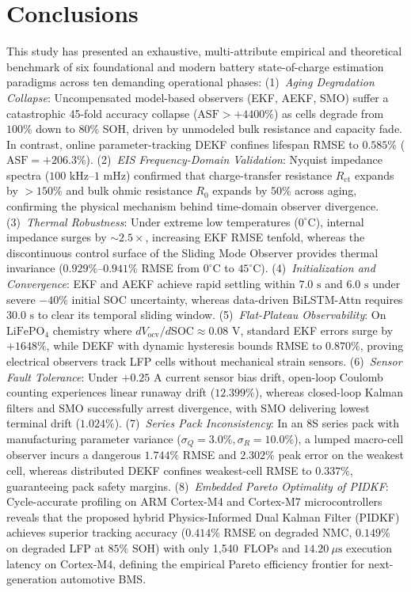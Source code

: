 \documentclass[balance,nocopyright,upint,varvw,hyphenate,barcolor=NavyBlue,nolists]{asmejour}
\begin{document}
\section{Conclusions}
This study has presented an exhaustive, multi-attribute empirical and theoretical benchmark of six foundational and modern battery state-of-charge estimation paradigms across ten demanding operational phases:
(1)~\emph{Aging Degradation Collapse}: Uncompensated model-based observers (EKF, AEKF, SMO) suffer a catastrophic 45-fold accuracy collapse ($\text{ASF} > +4400\%$) as cells degrade from $100\%$ down to $80\%$ SOH, driven by unmodeled bulk resistance and capacity fade. In contrast, online parameter-tracking DEKF confines lifespan RMSE to $0.585\%$ ($\text{ASF} = +206.3\%$).
(2)~\emph{EIS Frequency-Domain Validation}: Nyquist impedance spectra ($100\text{ kHz}$--$1\text{ mHz}$) confirmed that charge-transfer resistance $R_{\text{ct}}$ expands by $> 150\%$ and bulk ohmic resistance $R_0$ expands by $50\%$ across aging, confirming the physical mechanism behind time-domain observer divergence.
(3)~\emph{Thermal Robustness}: Under extreme low temperatures ($0^\circ\text{C}$), internal impedance surges by $\sim 2.5\times$, increasing EKF RMSE tenfold, whereas the discontinuous control surface of the Sliding Mode Observer provides thermal invariance ($0.929\%\text{--}0.941\%$ RMSE from $0^\circ\text{C}$ to $45^\circ\text{C}$).
(4)~\emph{Initialization and Convergence}: EKF and AEKF achieve rapid settling within $7.0\text{ s}$ and $6.0\text{ s}$ under severe $-40\%$ initial SOC uncertainty, whereas data-driven BiLSTM-Attn requires $30.0\text{ s}$ to clear its temporal sliding window.
(5)~\emph{Flat-Plateau Observability}: On $\text{LiFePO}_4$ chemistry where $d V_{\text{ocv}}/d\text{SOC} \approx 0.08\text{ V}$, standard EKF errors surge by $+1648\%$, while DEKF with dynamic hysteresis bounds RMSE to $0.870\%$, proving electrical observers track LFP cells without mechanical strain sensors.
(6)~\emph{Sensor Fault Tolerance}: Under $+0.25\text{ A}$ current sensor bias drift, open-loop Coulomb counting experiences linear runaway drift ($12.399\%$), whereas closed-loop Kalman filters and SMO successfully arrest divergence, with SMO delivering lowest terminal drift ($1.024\%$).
(7)~\emph{Series Pack Inconsistency}: In an 8S series pack with manufacturing parameter variance ($\sigma_Q = 3.0\%, \sigma_R = 10.0\%$), a lumped macro-cell observer incurs a dangerous $1.744\%$ RMSE and $2.302\%$ peak error on the weakest cell, whereas distributed DEKF confines weakest-cell RMSE to $0.337\%$, guaranteeing pack safety margins.
(8)~\emph{Embedded Pareto Optimality of PIDKF}: Cycle-accurate profiling on ARM Cortex-M4 and Cortex-M7 microcontrollers reveals that the proposed hybrid Physics-Informed Dual Kalman Filter (PIDKF) achieves superior tracking accuracy ($0.414\%$ RMSE on degraded NMC, $0.149\%$ on degraded LFP at $85\%$ SOH) with only 1,540~FLOPs and $14.20~\mu\text{s}$ execution latency on Cortex-M4, defining the empirical Pareto efficiency frontier for next-generation automotive BMS.
\end{document}
